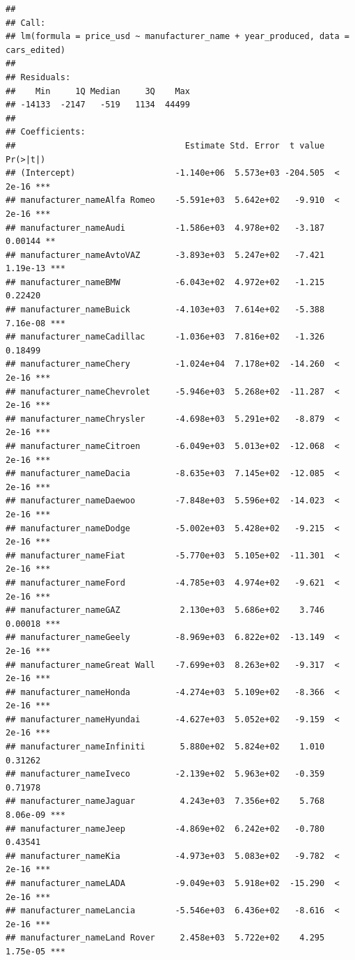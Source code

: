 \documentclass[
]{article}
\begin{document}
\begin{verbatim}
## 
## Call:
## lm(formula = price_usd ~ manufacturer_name + year_produced, data = cars_edited)
## 
## Residuals:
##    Min     1Q Median     3Q    Max 
## -14133  -2147   -519   1134  44499 
## 
## Coefficients:
##                                  Estimate Std. Error  t value Pr(>|t|)    
## (Intercept)                    -1.140e+06  5.573e+03 -204.505  < 2e-16 ***
## manufacturer_nameAlfa Romeo    -5.591e+03  5.642e+02   -9.910  < 2e-16 ***
## manufacturer_nameAudi          -1.586e+03  4.978e+02   -3.187  0.00144 ** 
## manufacturer_nameAvtoVAZ       -3.893e+03  5.247e+02   -7.421 1.19e-13 ***
## manufacturer_nameBMW           -6.043e+02  4.972e+02   -1.215  0.22420    
## manufacturer_nameBuick         -4.103e+03  7.614e+02   -5.388 7.16e-08 ***
## manufacturer_nameCadillac      -1.036e+03  7.816e+02   -1.326  0.18499    
## manufacturer_nameChery         -1.024e+04  7.178e+02  -14.260  < 2e-16 ***
## manufacturer_nameChevrolet     -5.946e+03  5.268e+02  -11.287  < 2e-16 ***
## manufacturer_nameChrysler      -4.698e+03  5.291e+02   -8.879  < 2e-16 ***
## manufacturer_nameCitroen       -6.049e+03  5.013e+02  -12.068  < 2e-16 ***
## manufacturer_nameDacia         -8.635e+03  7.145e+02  -12.085  < 2e-16 ***
## manufacturer_nameDaewoo        -7.848e+03  5.596e+02  -14.023  < 2e-16 ***
## manufacturer_nameDodge         -5.002e+03  5.428e+02   -9.215  < 2e-16 ***
## manufacturer_nameFiat          -5.770e+03  5.105e+02  -11.301  < 2e-16 ***
## manufacturer_nameFord          -4.785e+03  4.974e+02   -9.621  < 2e-16 ***
## manufacturer_nameGAZ            2.130e+03  5.686e+02    3.746  0.00018 ***
## manufacturer_nameGeely         -8.969e+03  6.822e+02  -13.149  < 2e-16 ***
## manufacturer_nameGreat Wall    -7.699e+03  8.263e+02   -9.317  < 2e-16 ***
## manufacturer_nameHonda         -4.274e+03  5.109e+02   -8.366  < 2e-16 ***
## manufacturer_nameHyundai       -4.627e+03  5.052e+02   -9.159  < 2e-16 ***
## manufacturer_nameInfiniti       5.880e+02  5.824e+02    1.010  0.31262    
## manufacturer_nameIveco         -2.139e+02  5.963e+02   -0.359  0.71978    
## manufacturer_nameJaguar         4.243e+03  7.356e+02    5.768 8.06e-09 ***
## manufacturer_nameJeep          -4.869e+02  6.242e+02   -0.780  0.43541    
## manufacturer_nameKia           -4.973e+03  5.083e+02   -9.782  < 2e-16 ***
## manufacturer_nameLADA          -9.049e+03  5.918e+02  -15.290  < 2e-16 ***
## manufacturer_nameLancia        -5.546e+03  6.436e+02   -8.616  < 2e-16 ***
## manufacturer_nameLand Rover     2.458e+03  5.722e+02    4.295 1.75e-05 ***

\end{verbatim}
\end{document}
